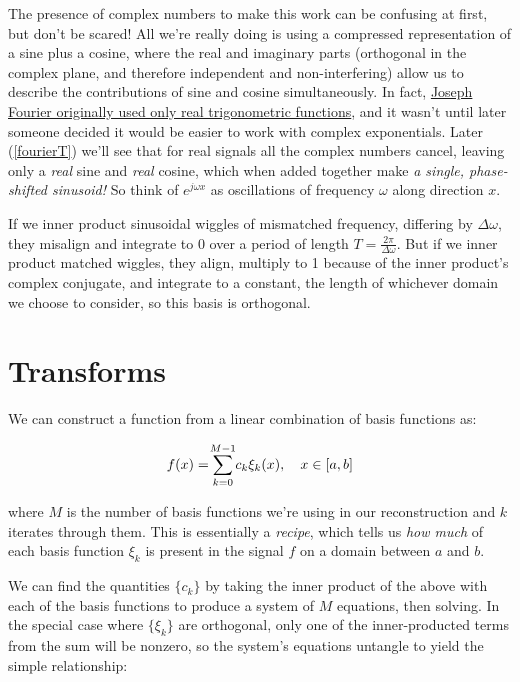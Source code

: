 \documentclass[10pt]{article}
\begin{document}
The presence of complex numbers to make this work can be confusing at first, but don't be scared! All we're really doing is using a compressed representation of a sine plus a cosine, where the real and imaginary parts (orthogonal in the complex plane, and therefore independent and non-interfering) allow us to describe the contributions of sine and cosine simultaneously. In fact, \href{https://math.stackexchange.com/a/1293127/278341}{Joseph Fourier originally used only real trigonometric functions}\cite{complex}, and it wasn't until later someone decided it would be easier to work with complex exponentials. Later (\autoref{fourierT}) we'll see that for real signals all the complex numbers cancel, leaving only a \textit{real} sine and \textit{real} cosine, which when added together make \textit{a single, phase-shifted sinusoid!} So think of $e^{j \omega x}$ as oscillations of frequency $\omega$ along direction $x$.

If we inner product sinusoidal wiggles of mismatched frequency, differing by $\Delta \omega$, they misalign and integrate to 0 over a period of length $T = \frac{2\pi}{\Delta \omega}$. But if we inner product matched wiggles, they align, multiply to 1 because of the inner product's complex conjugate, and integrate to a constant, the length of whichever domain we choose to consider, so this basis is orthogonal.

\section{Transforms}

We can construct a function from a linear combination of basis functions as:

\begin{equation}\label{spectralreconstruction}
f(x) = \sum_{k=0}^{\mathclap{M-1}} c_k \xi_k(x), \quad x \in [a, b]
\end{equation}

\noindent where $M$ is the number of basis functions we're using in our reconstruction and $k$ iterates through them. This is essentially a \textit{recipe}, which tells us \textit{how much} of each basis function $\xi_k$ is present in the signal $f$ on a domain between $a$ and $b$.

We can find the quantities $\{c_k\}$ by taking the inner product of the above with each of the basis functions to produce a system of $M$ equations, then solving. In the special case where $\{\xi_k\}$ are orthogonal, only one of the inner-producted terms from the sum will be nonzero, so the system's equations untangle to yield the simple relationship:
\end{document}
